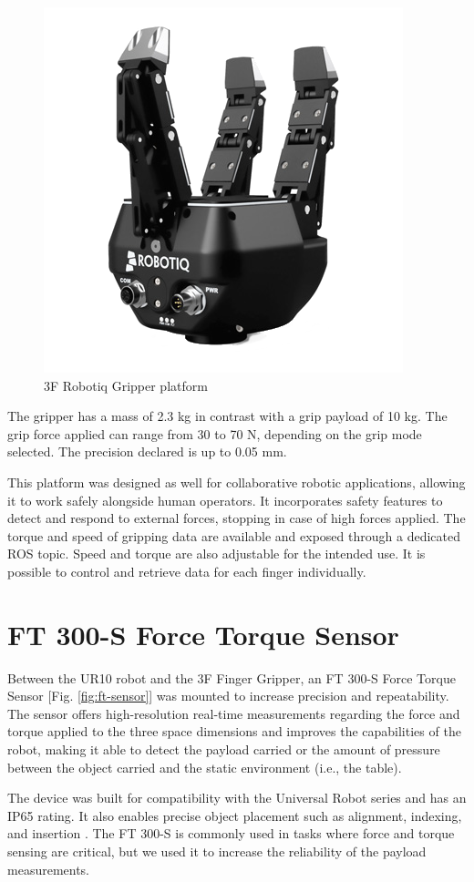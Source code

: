 \begin{figure}
	\centering
	\includegraphics[width=0.5\linewidth]{Images/gripper3f.png}
	\caption{3F Robotiq Gripper platform}
	\label{fig:gripper3f}
\end{figure}

The gripper has a mass of 2.3 kg in contrast with a grip payload of 10 kg. The grip force applied can range from 30 to 70 N, depending on the grip mode selected. The precision declared is up to 0.05 mm.

This platform was designed as well for collaborative robotic applications, allowing it to work safely alongside human operators. It incorporates safety features to detect and respond to external forces, stopping in case of high forces applied. The torque and speed of gripping data are available and exposed through a dedicated ROS topic. Speed and torque are also adjustable for the intended use. It is possible to control and retrieve data for each finger individually. 



\section{FT 300-S Force Torque Sensor}
Between the UR10 robot and the 3F Finger Gripper, an FT 300-S Force Torque Sensor [Fig. \ref{fig:ft-sensor}] was mounted to increase precision and repeatability. The sensor offers high-resolution real-time measurements regarding the force and torque applied to the three space dimensions and improves the capabilities of the robot, making it able to detect the payload carried or the amount of pressure between the object carried and the static environment (i.e., the table). 

The device was built for compatibility with the Universal Robot series and has an IP65 rating. It also enables precise object placement such as alignment, indexing, and insertion \cite{url:ftsensor}. The FT 300-S is commonly used in tasks where force and torque sensing are critical, but we used it to increase the reliability of the payload measurements. 

